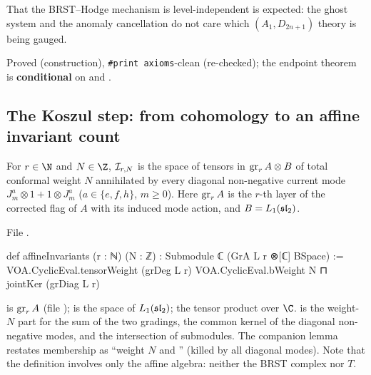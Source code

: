 \begin{physics}
That the BRST--Hodge mechanism is level-independent is expected: the ghost system and the anomaly cancellation do not
care which $(A_1,D_{2n+1})$ theory is being gauged.
\end{physics}

\begin{status}
Proved (construction), \texttt{\#print axioms}-clean (re-checked); the endpoint theorem is \textbf{conditional} on
 and .
\end{status}

\subsection{The Koszul step: from cohomology to an affine invariant count}

\begin{definition}\label{l29:def:invariants}
For $r\in\N$ and $N\in\Z$, $\mathcal I_{r,N}$ is the space of tensors in $\operatorname{gr}_rA\otimes B$ of total
conformal weight $N$ annihilated by every diagonal non-negative current mode $J^a_m\otimes1+1\otimes J^a_m$
($a\in\{e,f,h\}$, $m\ge0$). Here $\operatorname{gr}_rA$ is the $r$-th layer of the corrected flag of $A$ with its induced
mode action, and $B=L_1(\mathfrak{sl}_2)$.
\end{definition}

\noindent File .
\begin{leancode}
def affineInvariants (r : ℕ) (N : ℤ) : Submodule ℂ (GrA L r ⊗[ℂ] BSpace) :=
  VOA.CyclicEval.tensorWeight (grDeg L r) VOA.CyclicEval.bWeight N ⊓ jointKer (grDiag L r)
\end{leancode}

\begin{dictionary}
 is $\operatorname{gr}_rA$ (file );  is the space of
$L_1(\mathfrak{sl}_2)$;  the tensor product over $\C$.  is the weight-$N$ part for the
sum of the two gradings,  the common kernel of the diagonal non-negative modes, and
 the intersection of submodules. The companion lemma  restates membership as
``weight $N$ and '' (killed by all diagonal modes). Note that the definition involves only the affine
algebra: neither the BRST complex nor $T$.
\end{dictionary}

